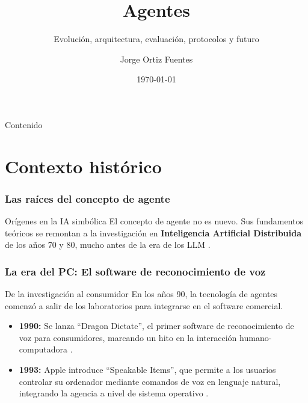 \documentclass[handout]{beamer}
\title{Agentes}
\subtitle{Evolución, arquitectura, evaluación, protocolos y futuro}
\author{Jorge Ortiz Fuentes}
\date{\today}
\begin{document}
\begin{frame}[plain]
  \titlepage
\end{frame}

\begin{frame}{Contenido}
  \tableofcontents[hideallsubsections]
\end{frame}

\section{Contexto histórico}

\begin{frame}
  \frametitle{Las raíces del concepto de agente}
  \begin{block}{Orígenes en la IA simbólica}
    El concepto de agente no es nuevo. Sus fundamentos teóricos se remontan a la investigación en \textbf{Inteligencia Artificial Distribuida} de los años 70 y 80, mucho antes de la era de los LLM \parencite{krishnan2025aiagentsevolutionarchitecture}.
  \end{block}
\end{frame}

\begin{frame}
    \frametitle{La era del PC: El software de reconocimiento de voz}
    \begin{block}{De la investigación al consumidor}
     En los años 90, la tecnología de agentes comenzó a salir de los laboratorios para integrarse en el software comercial.
     \begin{itemize}
         \item \textbf{1990:} Se lanza ``Dragon Dictate'', el primer software de reconocimiento de voz para consumidores, marcando un hito en la interacción humano-computadora \parencite{li2024personalllmagentsinsights}.
         \medskip
         \item \textbf{1993:} Apple introduce ``Speakable Items'', que permite a los usuarios controlar su ordenador mediante comandos de voz en lenguaje natural, integrando la agencia a nivel de sistema operativo \parencite{li2024personalllmagentsinsights}.
     \end{itemize}
    \end{block}
\end{frame}
\end{document}

